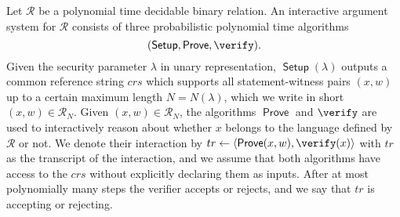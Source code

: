 \documentclass[10pt,article,oneside]{memoir}
\theoremstyle{definition}
\theoremstyle{remark}
\DeclareMathOperator{\setup}{\mathsf{Setup}}
\DeclareMathOperator{\prove}{\mathsf{Prove}}
\begin{document}


Let $\mathcal R$ be a polynomial time decidable binary relation.
An interactive argument system for $\mathcal R$ consists of three probabilistic polynomial time algorithms 
\[
(\setup, \prove, \verify).
\]
%
Given the security parameter $\lambda$ in unary representation, $\setup(\lambda)$ outputs a common reference string $crs$ which supports all statement-witness pairs $(x,w)$ up to a certain maximum length $N=N(\lambda)$, which we write in short $(x,w)\in\mathcal R_N$.
Given $(x,w)\in\mathcal R_N$, the algorithms $\prove$ and $\verify$ are used to interactively reason about whether $x$ belongs to the language defined by $\mathcal R$ or not.
We denote their interaction by $tr\leftarrow\langle \prove(x,w), \verify(x)\rangle$ with $tr$ as the transcript of the interaction, and we assume that both algorithms have access to the $crs$ without explicitly declaring them as inputs.
After at most polynomially many steps the verifier accepts or rejects, and we say that $tr$ is accepting or rejecting.


%
%
\end{document}

